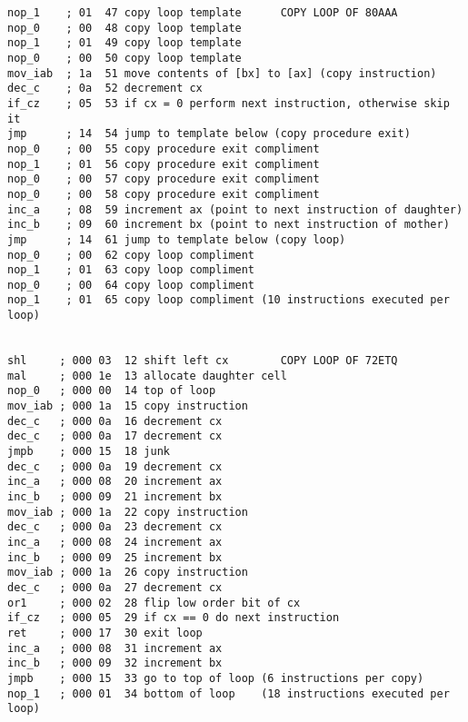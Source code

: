 \newpage

\begin{verbatim}
nop_1    ; 01  47 copy loop template      COPY LOOP OF 80AAA
nop_0    ; 00  48 copy loop template
nop_1    ; 01  49 copy loop template
nop_0    ; 00  50 copy loop template
mov_iab  ; 1a  51 move contents of [bx] to [ax] (copy instruction)
dec_c    ; 0a  52 decrement cx
if_cz    ; 05  53 if cx = 0 perform next instruction, otherwise skip it
jmp      ; 14  54 jump to template below (copy procedure exit)
nop_0    ; 00  55 copy procedure exit compliment
nop_1    ; 01  56 copy procedure exit compliment
nop_0    ; 00  57 copy procedure exit compliment
nop_0    ; 00  58 copy procedure exit compliment
inc_a    ; 08  59 increment ax (point to next instruction of daughter)
inc_b    ; 09  60 increment bx (point to next instruction of mother)
jmp      ; 14  61 jump to template below (copy loop)
nop_0    ; 00  62 copy loop compliment
nop_1    ; 01  63 copy loop compliment
nop_0    ; 00  64 copy loop compliment
nop_1    ; 01  65 copy loop compliment (10 instructions executed per loop)


shl     ; 000 03  12 shift left cx        COPY LOOP OF 72ETQ
mal     ; 000 1e  13 allocate daughter cell
nop_0   ; 000 00  14 top of loop
mov_iab ; 000 1a  15 copy instruction
dec_c   ; 000 0a  16 decrement cx
dec_c   ; 000 0a  17 decrement cx
jmpb    ; 000 15  18 junk
dec_c   ; 000 0a  19 decrement cx
inc_a   ; 000 08  20 increment ax
inc_b   ; 000 09  21 increment bx
mov_iab ; 000 1a  22 copy instruction
dec_c   ; 000 0a  23 decrement cx
inc_a   ; 000 08  24 increment ax
inc_b   ; 000 09  25 increment bx
mov_iab ; 000 1a  26 copy instruction
dec_c   ; 000 0a  27 decrement cx
or1     ; 000 02  28 flip low order bit of cx
if_cz   ; 000 05  29 if cx == 0 do next instruction
ret     ; 000 17  30 exit loop
inc_a   ; 000 08  31 increment ax
inc_b   ; 000 09  32 increment bx
jmpb    ; 000 15  33 go to top of loop (6 instructions per copy)
nop_1   ; 000 01  34 bottom of loop    (18 instructions executed per loop)
\end{verbatim}


